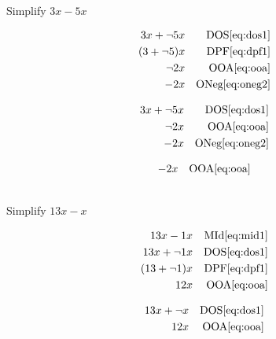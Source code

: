 \begin{example}[id:20141121-193636] \label{20141121-193636} \hfill \\

Simplify $3x-5x$

\soln

\solnsteps
\begin{align*}
3x + \neg 5x && \text{DOS} \eqref{eq:dos1} \\
(3+ \neg 5)x && \text{DPF} \eqref{eq:dpf1} \\
\neg 2x && \text{OOA} \eqref{eq:ooa} \\
-2x && \text{ONeg} \eqref{eq:oneg2} 
\end{align*}

\soln

\lesssteps
\begin{align*}
3x + \neg 5x && \text{DOS} \eqref{eq:dos1} \\
\neg 2x && \text{OOA} \eqref{eq:ooa} \\
-2x && \text{ONeg} \eqref{eq:oneg2} 
\end{align*}

\soln

\lesssteps
\begin{align*}
-2x && \text{OOA} \eqref{eq:ooa} 
\end{align*}

\end{example}

\begin{example}[id:20141106-150622] \label{20141106-150622}  \hfill \\

Simplify $13x-x$

\soln

\solnsteps
\begin{align*}
13x-1x && \text{MId} \eqref{eq:mid1} \\
13x+\neg 1x && \text{DOS} \eqref{eq:dos1} \\
(13+\neg 1)x && \text{DPF} \eqref{eq:dpf1} \\
12x && \text{OOA} \eqref{eq:ooa} 
\end{align*}

\soln

\lesssteps
\begin{align*}
13x + \neg x && \text{DOS} \eqref{eq:dos1} \\
12 x && \text{OOA} \eqref{eq:ooa} 
\end{align*}
\end{example}


